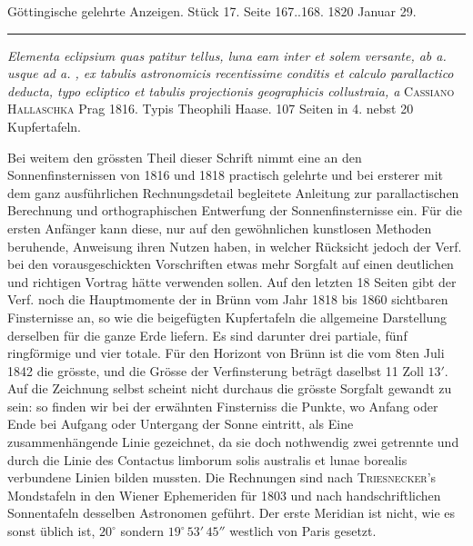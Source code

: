 \clearpage
{}
\begin{center}\small Göttingische gelehrte Anzeigen. Stück 17. Seite 167..168. 1820 Januar 29.\\[3pt]\rule{.72\linewidth}{.3pt}\end{center}

\emph{Elementa eclipsium quas patitur tellus, luna eam inter et solem versante, ab a. {} usque ad a. {}, ex tabulis astronomicis recentissime conditis et calculo parallactico deducta, typo ecliptico et tabulis projectionis geographicis collustraia, a} \textsc{Cassiano Hallaschka} Prag 1816. Typis Theophili Haase. 107 Seiten in 4. nebst 20 Kupfertafeln.

Bei weitem den grössten Theil dieser Schrift nimmt eine an den Sonnenfinsternissen von 1816 und 1818 practisch gelehrte und bei ersterer mit dem ganz ausführlichen Rechnungsdetail begleitete Anleitung zur parallactischen Berechnung und orthographischen Entwerfung der Sonnenfinsternisse ein. Für die ersten Anfänger kann diese, nur auf den gewöhnlichen kunstlosen Methoden beruhende, Anweisung ihren Nutzen haben, in welcher Rücksicht jedoch der Verf. bei den vorausgeschickten Vorschriften etwas mehr Sorgfalt auf einen deutlichen und richtigen Vortrag hätte verwenden sollen. Auf den letzten 18 Seiten gibt der Verf. noch die Hauptmomente der in Brünn vom Jahr 1818 bis 1860 sichtbaren Finsternisse an, so wie die beigefügten Kupfertafeln die allgemeine Darstellung derselben für die ganze Erde liefern. Es sind darunter drei partiale, fünf ringförmige und vier totale. Für den Horizont von Brünn ist die vom 8ten Juli 1842 die grösste, und die Grösse der Verfinsterung beträgt daselbst 11 Zoll $13'$. Auf die Zeichnung selbst scheint nicht durchaus die grösste Sorgfalt gewandt zu sein: so finden wir bei der erwähnten Finsterniss die Punkte, wo Anfang oder Ende bei Aufgang oder Untergang der Sonne eintritt, als Eine zusammenhängende Linie gezeichnet, da sie doch nothwendig zwei getrennte und durch die Linie des Contactus limborum solis australis et lunae borealis verbundene Linien bilden mussten. Die Rechnungen sind nach \textsc{Triesnecker}'s Mondstafeln in den Wiener Ephemeriden für 1803 und nach handschriftlichen Sonnentafeln desselben Astronomen geführt. Der erste Meridian ist nicht, wie es sonst üblich ist, $20^\circ$ sondern $19^\circ\,53'\,45''$ westlich von Paris gesetzt.
